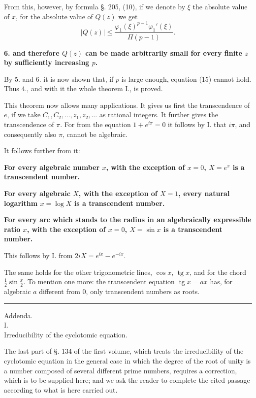 \documentclass[11pt]{article}
\newcommand{\abs}[1]{\left|#1\right|}
\newcommand{\tg}{\operatorname{tg}}
\begin{document}
From this, however, by formula §. 205, (10), if we denote by $\xi$ the absolute value of $x$, for the absolute value of $Q(z)$ we get
\[
\abs{Q(z)}\leq \frac{\varphi_1(\xi)^{p-1}\varphi_1'(\xi)}{\Pi(p-1)}.
\]

\textbf{6. and therefore $Q(z)$ can be made arbitrarily small for every finite $z$ by sufficiently increasing $p$.}

By 5. and 6. it is now shown that, if $p$ is large enough, equation (15) cannot hold. Thus 4., and with it the whole theorem I., is proved.

This theorem now allows many applications. It gives us first the transcendence of $e$, if we take $C_1,C_2,\ldots,z_1,z_2,\ldots$ as rational integers. It further gives the transcendence of $\pi$. For from the equation $1+e^{i\pi}=0$ it follows by I. that $i\pi$, and consequently also $\pi$, cannot be algebraic.

It follows further from it:

\begin{center}
\textbf{For every algebraic number $x$, with the exception of $x=0$, $X=e^x$ is a transcendent number.}

\textbf{For every algebraic $X$, with the exception of $X=1$, every natural logarithm $x=\log X$ is a transcendent number.}

\textbf{For every arc which stands to the radius in an algebraically expressible ratio $x$, with the exception of $x=0$, $X=\sin x$ is a transcendent number.}
\end{center}

This follows by I. from $2iX=e^{ix}-e^{-ix}$.

The same holds for the other trigonometric lines, $\cos x$, $\tg x$, and for the chord $\frac12\sin\frac{x}{2}$. To mention one more: the transcendent equation $\tg x=ax$ has, for algebraic $a$ different from 0, only transcendent numbers as roots.

\bigskip
\begin{center}\rule{0.28\linewidth}{0.4pt}\end{center}

\clearpage
\begin{center}
{\Large Addenda.}\\[1em]
{\large I.}\\[0.5em]
{\large Irreducibility of the cyclotomic equation.}
\end{center}

The last part of §. 134 of the first volume, which treats the irreducibility of the cyclotomic equation in the general case in which the degree of the root of unity is a number composed of several different prime numbers, requires a correction, which is to be supplied here; and we ask the reader to complete the cited passage according to what is here carried out.
\end{document}
